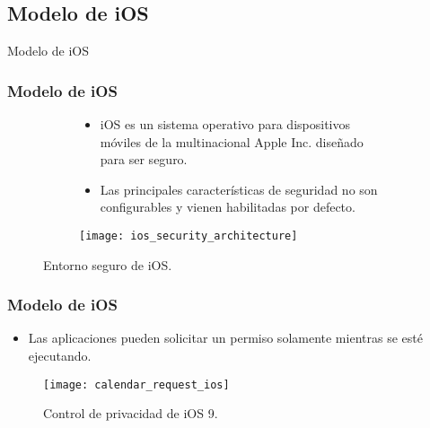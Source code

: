\subsection{Modelo de iOS}
\begin{frame}
 \begin{center}
  \LARGE Modelo de iOS
 \end{center}
\end{frame}
\begin{frame}
 \frametitle{Modelo de iOS}
 \begin{figure}[tH]
  \begin{subfigure}{0.7\linewidth}
   \begin{itemize}
    \item iOS es un sistema operativo para dispositivos móviles de la multinacional Apple Inc. diseñado para ser
seguro. \pause
    \item Las principales características de seguridad no son configurables y vienen habilitadas por defecto. \pause
   \end{itemize}
  \end{subfigure}
  \begin{subfigure}{0.25\linewidth}\pause
    \centering
    \texttt{[image: ios\_security\_architecture]}
  \end{subfigure}
  \caption{Entorno seguro de iOS.}
\end{figure}
\end{frame}
\begin{frame}
 \frametitle{Modelo de iOS}
 \begin{itemize}
  \item Las aplicaciones pueden solicitar un permiso solamente mientras se esté ejecutando. \pause
 \end{itemize}
 \begin{figure}[hbtp]
    \centering
    \texttt{[image: calendar\_request\_ios]}
    \caption{Control de privacidad de iOS 9.}
 \end{figure}
\end{frame}
